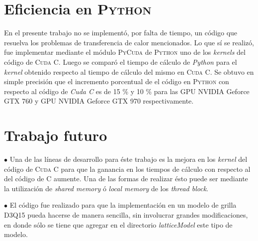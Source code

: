 \section{Eficiencia en \textsc{Python}}

En el presente trabajo no se implementó, por falta de tiempo, un código que resuelva los problemas de transferencia de calor mencionados. Lo que sí se realizó, fue implementar mediante el módulo \textsc{PyCuda} de \textsc{Python} uno de los \textit{kernels} del código de \textsc{Cuda C}. Luego se comparó el tiempo de cálculo de \textit{Python} para el \textit{kernel} obtenido respecto al tiempo de cálculo del mismo en \textsc{Cuda C}. Se obtuvo en simple precisión que el incremento porcentual de el código en \textsc{Python} con respecto al código de \textit{Cuda C} es de 15 \% y 10 \% para las GPU NVIDIA Geforce GTX 760 y GPU NVIDIA Geforce GTX 970 respectivamente.

\section{Trabajo futuro}

$\bullet$ Una de las líneas de desarrollo para éste trabajo es la mejora en los \textit{kernel} del código de \textsc{Cuda C} para que la ganancia en los tiempos de cálculo con respecto al del código de \textsc{C} aumente. Una de las formas de realizar ésto puede ser mediante la utilización de \textit{shared memory} ó \textit{local memory} de los \textit{thread block}. 

$\bullet$ El código fue realizado para que la implementación en un modelo de grilla D3Q15 pueda hacerse de manera sencilla, sin involucrar grandes modificaciones, en donde sólo se tiene que agregar en el directorio \textit{latticeModel} este tipo de modelo. 

%
%


